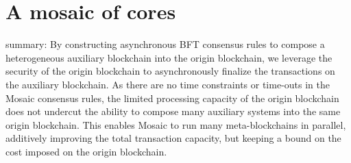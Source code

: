 \documentclass[12pt,a4paper]{article}
\begin{document}
%
%
\section{A mosaic of cores}

summary:
By constructing asynchronous BFT consensus rules to compose a heterogeneous auxiliary blockchain into the origin blockchain, we leverage the security of the origin blockchain to asynchronously finalize the transactions on the auxiliary blockchain.
As there are no time constraints or time-outs in the Mosaic consensus rules, the limited processing capacity of the origin blockchain does not undercut the ability to compose many auxiliary systems into the same origin blockchain.
This enables Mosaic to run many meta-blockchains in parallel, additively improving the total transaction capacity, but keeping a bound on the cost imposed on the origin blockchain.

%
%

%
%

\end{document}
